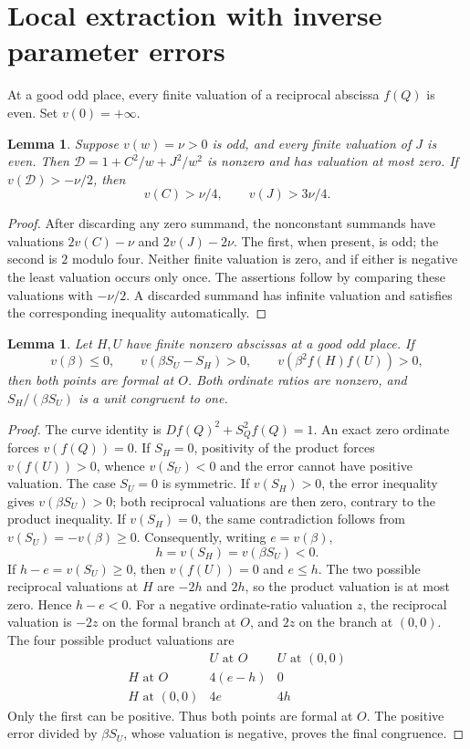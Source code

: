 \documentclass[11pt,a4paper]{article}
\newtheorem{lemma}[theorem]{Lemma}
\begin{document}
\section{Local extraction with inverse parameter errors}
At a good odd place, every finite valuation of a reciprocal abscissa
$f(Q)$ is even. Set $v(0)=+\infty$.

\begin{lemma}\label{lem:factor}
Suppose $v(w)=\nu>0$ is odd, and every finite valuation of $J$ is
even. Then $\mathcal D=1+C^2/w+J^2/w^2$ is nonzero and has
valuation at most zero. If $v(\mathcal D)>-\nu/2$, then
\[
                         v(C)>\nu/4,\qquad v(J)>3\nu/4.
\]
\end{lemma}
\begin{proof}
After discarding any zero summand, the nonconstant summands have
valuations $2v(C)-\nu$ and $2v(J)-2\nu$. The first, when present,
is odd; the second is $2$ modulo four. Neither finite valuation
is zero, and if either is negative the least valuation occurs
only once. The assertions follow by comparing these valuations
with $-\nu/2$. A discarded summand has infinite valuation and
satisfies the corresponding inequality automatically.
\end{proof}

\begin{lemma}\label{lem:inverse}
Let $H,U$ have finite nonzero abscissas at a good odd place.
If
\[
 v(\beta)\le0,\qquad v(\beta S_U-S_H)>0,\qquad
                       v(\beta^2f(H)f(U))>0,
\]
then both points are formal at $O$. Both ordinate ratios are
nonzero, and $S_H/(\beta S_U)$ is a unit congruent to one.
\end{lemma}
\begin{proof}
The curve identity is $Df(Q)^2+S_Q^2f(Q)=1$.
An exact zero ordinate forces $v(f(Q))=0$. If $S_H=0$, positivity
of the product forces $v(f(U))>0$, whence $v(S_U)<0$ and the
error cannot have positive valuation. The case $S_U=0$ is symmetric.
If $v(S_H)>0$, the error inequality gives $v(\beta S_U)>0$;
both reciprocal valuations are then zero, contrary to the product
inequality. If $v(S_H)=0$, the same contradiction follows from
$v(S_U)=-v(\beta)\ge0$. Consequently, writing $e=v(\beta)$,
\[
                         h=v(S_H)=v(\beta S_U)<0.
\]
If $h-e=v(S_U)\ge0$, then $v(f(U))=0$ and $e\le h$.
The two possible reciprocal valuations at $H$ are $-2h$ and
$2h$, so the product valuation is at most zero. Hence $h-e<0$.
For a negative ordinate-ratio valuation $z$, the reciprocal
valuation is $-2z$ on the formal branch at $O$, and $2z$ on the
branch at $(0,0)$. The four possible product valuations are
\[
\begin{array}{c|cc}
 & U\text{ at }O & U\text{ at }(0,0)\\\hline
 H\text{ at }O &4(e-h)&0\\
 H\text{ at }(0,0)&4e&4h
\end{array}
\]
Only the first can be positive. Thus both points are formal at $O$.
The positive error divided by $\beta S_U$, whose valuation is
negative, proves the final congruence.
\end{proof}
\end{document}
